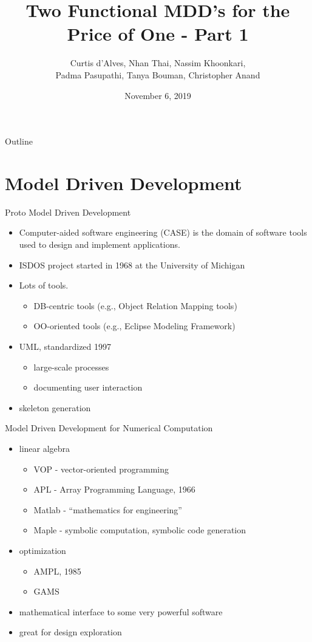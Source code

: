 \documentclass[presentation]{beamer}
\author{Curtis d'Alves, Nhan Thai, Nassim Khoonkari, \\ Padma Pasupathi, Tanya Bouman, Christopher Anand}
\date{November 6, 2019}
\title{Two Functional MDD's for the Price of One - Part 1}
\begin{document}
\maketitle
\begin{frame}{Outline}
\tableofcontents
\end{frame}


\section{Model Driven Development}
\label{sec:orgf064032}
\begin{frame}[label={sec:org9c2735a}]{Proto Model Driven Development}
\begin{itemize}
\item Computer-aided software engineering (CASE) is the domain of software tools used to design and implement applications.
\item ISDOS project started in 1968 at the University of Michigan
\item Lots of tools.
  \begin{itemize}
  \item DB-centric tools (e.g., Object Relation Mapping tools)
  \item OO-oriented tools (e.g., Eclipse Modeling Framework)
  \end{itemize}
\item UML, standardized 1997
  \begin{itemize}
  \item large-scale processes
  \item documenting user interaction
  \end{itemize}
\item skeleton generation    
\end{itemize}
\end{frame}
\begin{frame}{Model Driven Development for Numerical Computation}
\begin{itemize}
\item linear algebra
  \begin{itemize}
  \item VOP - vector-oriented programming
  \item APL - Array Programming Language, 1966
  \item Matlab - ``mathematics for engineering''
  \item Maple - symbolic computation, symbolic code generation
  \end{itemize}
\item optimization
  \begin{itemize}
  \item AMPL, 1985
  \item GAMS
  \end{itemize}
\item mathematical interface to some very powerful software
\item great for design exploration
\end{itemize}
\end{frame}
\end{document}
